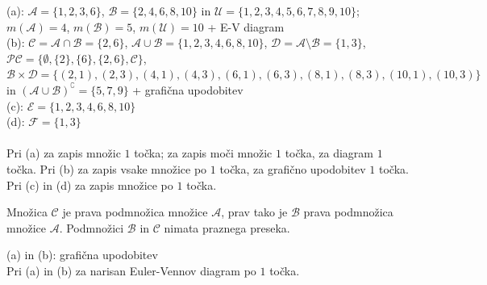 \documentclass[addpoints,12pt]{exam}
\begin{document}
\begin{questions}
    \begin{solution}[9cm]
        (a): $\mathcal{A}=\{1,2,3,6\}$, $\mathcal{B}=\{2,4,6,8,10\}$ in $\mathcal{U}=\{1,2,3,4,5,6,7,8,9,10\}$; $m(\mathcal{A})=4$, $m(\mathcal{B})=5$, $m(\mathcal{U})=10$ + E-V diagram \\
        (b): $\mathcal{C}=\mathcal{A}\cap\mathcal{B}=\{2,6\}$, $\mathcal{A}\cup\mathcal{B}=\{1,2,3,4,6,8,10\}$, $\mathcal{D}=\mathcal{A}\setminus\mathcal{B}=\{1,3\}$, $\mathcal{PC}=\{\emptyset,\{2\},\{6\},\{2,6\},\mathcal{C}\}$, $\mathcal{B}\times\mathcal{D}=\{(2,1),(2,3),(4,1),(4,3),(6,1),(6,3),(8,1),(8,3),(10,1),(10,3)\}$ in $(\mathcal{A}\cup\mathcal{B})^\complement=\{5,7,9\}$ + grafična upodobitev\\
        (c): $\mathcal{E}=\{1,2,3,4,6,8,10\}$ \\
        (d): $\mathcal{F}=\{1,3\}$ \\ \\
        Pri (a) za zapis množic $1$ točka; za zapis moči množic $1$ točka, za diagram $1$ točka. Pri (b) za zapis vsake množice po $1$ točka, za grafično upodobitev $1$ točka. Pri (c) in (d) za zapis množice po $1$ točka.
    \end{solution}

    \newpage

    \question
    Množica $\mathcal{C}$ je prava podmnožica množice $\mathcal{A}$, prav tako je $\mathcal{B}$ prava podmnožica množice $\mathcal{A}$. Podmnožici $\mathcal{B}$ in $\mathcal{C}$ nimata praznega preseka.

    \begin{solution}[1cm]
        (a) in (b): grafična upodobitev \\
        Pri (a) in (b) za narisan Euler-Vennov diagram po $1$ točka.
    \end{solution}





\end{questions}
\end{document}

